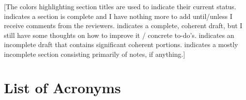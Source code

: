 \setcounter{tocdepth}{4}

\cleardoublepage


\begingroup
\let\clearpage\endgroup

[The colors highlighting section titles are used to indicate their current status.  indicates a section is complete and I have nothing more to add until/unless I receive comments from the reviewers.  indicates a complete, coherent draft, but I still have some thoughts on how to improve it / concrete to-do's. \hlc[yellow]{Yellow]} indicates an incomplete draft that contains significant coherent portions.  indicates a mostly incomplete section consisting primarily of notes, if anything.]

\tableofcontents
\newpage
\listoffigures
\newpage
\listoftables
\newpage
\chapter*{List of Acronyms}

